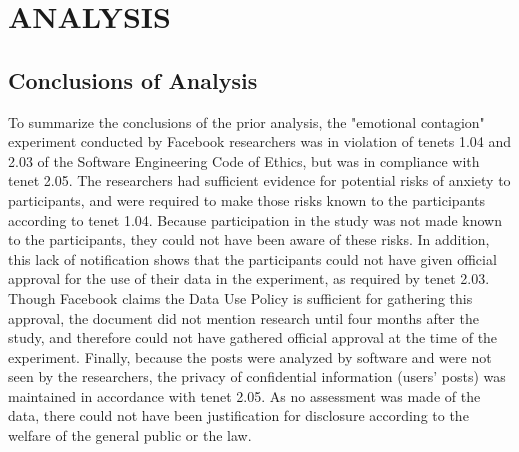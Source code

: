 \section{ANALYSIS}




\subsection{Conclusions of Analysis}
To summarize the conclusions of the prior analysis, the "emotional contagion" experiment conducted by Facebook researchers was in violation of tenets 1.04 and 2.03 of the Software Engineering Code of Ethics, but was in compliance with tenet 2.05.  The researchers had sufficient evidence for potential risks of anxiety to participants, and were required to make those risks known to the participants according to tenet 1.04.  Because participation in the study was not made known to the participants, they could not have been aware of these risks.  In addition, this lack of notification shows that the participants could not have given official approval for the use of their data in the experiment, as required by tenet 2.03.  Though Facebook claims the Data Use Policy is sufficient for gathering this approval, the document did not mention research until four months after the study, and therefore could not have gathered official approval at the time of the experiment.  Finally, because the posts were analyzed by software and were not seen by the researchers, the privacy of confidential information (users' posts) was maintained in accordance with tenet 2.05.  As no assessment was made of the data, there could not have been justification for disclosure according to the welfare of the general public or the law.
